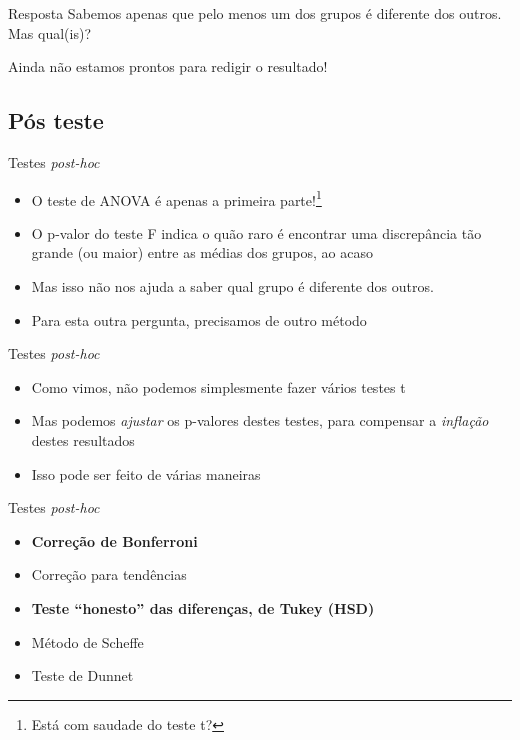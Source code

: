 \documentclass{beamer}
\begin{document}
\begin{frame}{}
  \begin{block}{Resposta}
    Sabemos apenas que pelo menos um dos grupos é diferente dos outros.
    Mas qual(is)?

    \bigskip
    Ainda não estamos prontos para redigir o resultado!
  \end{block}
\end{frame}

\subsection{Pós teste}

\begin{frame}{Testes {\em post-hoc}}
  \begin{itemize}
  \item O teste de ANOVA é apenas a primeira parte!\footnote{Está com saudade do teste t?}
  \item O p-valor do teste F indica o quão raro é encontrar uma discrepância tão grande (ou maior) entre as médias dos grupos, ao acaso
  \item Mas isso não nos ajuda a saber qual grupo é diferente dos outros.
  \item Para esta outra pergunta, precisamos de outro método
  \end{itemize}
\end{frame}

\begin{frame}{Testes {\em post-hoc}}
  \begin{itemize}
  \item Como vimos, não podemos simplesmente fazer vários testes t
  \item Mas podemos {\em ajustar} os p-valores destes testes, para compensar a {\em inflação} destes resultados
  \item Isso pode ser feito de várias maneiras
  \end{itemize}
\end{frame}

\begin{frame}{Testes {\em post-hoc}}
  \begin{itemize}
  \item {\bf Correção de Bonferroni}
  \item Correção para tendências
  \item {\bf Teste ``honesto'' das diferenças, de Tukey (HSD)}
  \item Método de Scheffe
  \item Teste de Dunnet
  \end{itemize}
\end{frame}
\end{document}
